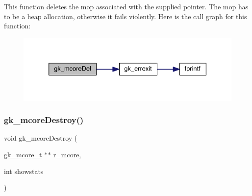 This function deletes the mop associated with the supplied pointer. The mop has to be a heap allocation, otherwise it fails violently. Here is the call graph for this function\+:\nopagebreak
\begin{figure}[H]
\begin{center}
\leavevmode
\includegraphics[width=330pt]{a00107_a0e63861ea56a62080a63408af43a9075_cgraph}
\end{center}
\end{figure}
\mbox{\label{a00107_acecd8b70b01b2b365695f034967c9536}} 
\subsubsection{\texorpdfstring{gk\+\_\+mcore\+Destroy()}{gk\_mcoreDestroy()}}
{\footnotesize\ttfamily void gk\+\_\+mcore\+Destroy (\begin{DoxyParamCaption}\item[{\hyperlink{a00682}{gk\+\_\+mcore\+\_\+t} $\ast$$\ast$}]{r\+\_\+mcore,  }\item[{int}]{showstats }\end{DoxyParamCaption})}

